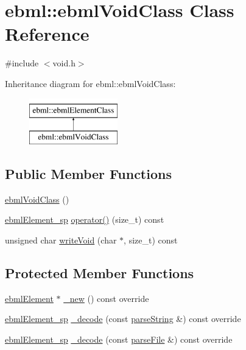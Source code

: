 \hypertarget{classebml_1_1ebmlVoidClass}{}\section{ebml\+:\+:ebml\+Void\+Class Class Reference}
\label{classebml_1_1ebmlVoidClass}


{\ttfamily \#include $<$void.\+h$>$}

Inheritance diagram for ebml\+:\+:ebml\+Void\+Class\+:\begin{figure}[H]
\begin{center}
\leavevmode
\includegraphics[height=2.000000cm]{classebml_1_1ebmlVoidClass}
\end{center}
\end{figure}
\subsection*{Public Member Functions}
\begin{DoxyCompactItemize}
\item 
\mbox{\hyperlink{classebml_1_1ebmlVoidClass_afc8666d6bbcd41bad76bfc5a2b5b4c9a}{ebml\+Void\+Class}} ()
\item 
\mbox{\hyperlink{namespaceebml_adad533b7705a16bb360fe56380c5e7be}{ebml\+Element\+\_\+sp}} \mbox{\hyperlink{classebml_1_1ebmlVoidClass_ad570c8614bf8fc88edecbbe0d3a335e6}{operator()}} (size\+\_\+t) const
\item 
unsigned char \mbox{\hyperlink{classebml_1_1ebmlVoidClass_af6a9a389aa1e83b0559a90740808b707}{write\+Void}} (char $\ast$, size\+\_\+t) const
\end{DoxyCompactItemize}
\subsection*{Protected Member Functions}
\begin{DoxyCompactItemize}
\item 
\mbox{\hyperlink{classebml_1_1ebmlElement}{ebml\+Element}} $\ast$ \mbox{\hyperlink{classebml_1_1ebmlVoidClass_a3403a8145594a3ce5e34b02dd2f938ae}{\+\_\+new}} () const override
\item 
\mbox{\hyperlink{namespaceebml_adad533b7705a16bb360fe56380c5e7be}{ebml\+Element\+\_\+sp}} \mbox{\hyperlink{classebml_1_1ebmlVoidClass_ab12dc43d26e82dee3c66d69219e4d78d}{\+\_\+decode}} (const \mbox{\hyperlink{classebml_1_1parseString}{parse\+String}} \&) const override
\item 
\mbox{\hyperlink{namespaceebml_adad533b7705a16bb360fe56380c5e7be}{ebml\+Element\+\_\+sp}} \mbox{\hyperlink{classebml_1_1ebmlVoidClass_a4b4b65f2289a5f4cbd182dac7b5aa1db}{\+\_\+decode}} (const \mbox{\hyperlink{classebml_1_1parseFile}{parse\+File}} \&) const override
\end{DoxyCompactItemize}
